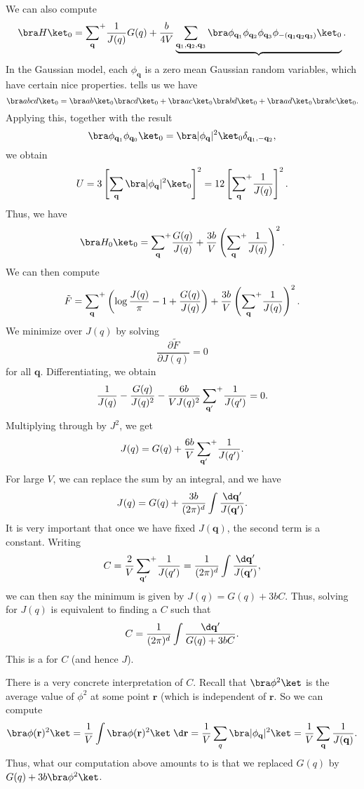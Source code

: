 \documentclass[a4paper]{article}
\newcommand\splus{\!{\vphantom{\prod}}^+}
\begin{document}
We can also compute
\[
  \bra H\ket_0 = \sum_\mathbf{q} \splus \frac{1}{J(q)} G(q) + \frac{b}{4V} \underbrace{\sum_{\mathbf{q}_1, \mathbf{q}_2, \mathbf{q}_3}\bra \phi_{\mathbf{q}_1} \phi_{\mathbf{q}_2} \phi_{\mathbf{q}_3} \phi_{-(\mathbf{q}_1 \mathbf{q}_2 \mathbf{q}_3)}\ket_0}.
\]
In the Gaussian model, each $\phi_\mathbf{q}$ is a zero mean Gaussian random variables, which have certain nice properties.  tells us we have
\[
  \bra abcd \ket_0 = \bra ab\ket_0 \bra cd\ket_0 + \bra ac\ket_0 \bra bd\ket_0 + \bra ad\ket_0 \bra bc\ket_0.
\]
Applying this, together with the result
\[
  \bra \phi_{\mathbf{q}_1} \phi_{\mathbf{q}_0}\ket_0 = \bra |\phi_\mathbf{q}|^2 \ket_0 \delta_{\mathbf{q}_1, - \mathbf{q}_2},
\]
we obtain
\[
  U = 3 \left[\sum_\mathbf{q} \bra |\phi_\mathbf{q}|^2\ket_0\right]^2 = 12 \left[\sum_\mathbf{q} \splus \frac{1}{J(q)}\right]^2.
\]
Thus, we have
\[
  \bra H_0\ket_0 = \sum_{\mathbf{q}} \splus \frac{G(q)}{J(q)} + \frac{3b}{V} \left(\sum_\mathbf{q} \splus \frac{1}{J(q)}\right)^2.
\]
We can then compute
\[
  \tilde{F} = \sum_{\mathbf{q}} \splus \left(\log \frac{J(q)}{\pi} - 1 + \frac{G(q)}{J(q)}\right) + \frac{3b}{V}\left(\sum_\mathbf{q} \splus \frac{1}{J(q)}\right)^2.
\]
We minimize over $J(q)$ by solving
\[
  \frac{\partial \tilde{F}}{\partial J(q)} = 0
\]
for all $\mathbf{q}$. Differentiating, we obtain
\[
  \frac{1}{J(q)} - \frac{G(q)}{J(q)^2} - \frac{6b}{V J(q)^2} \sum_{\mathbf{q}'} \splus \frac{1}{J(q')} = 0.
\]
Multiplying through by $J^2$, we get
\[
  J(q) = G(q) + \frac{6b}{V} \sum_{\mathbf{q}'} \splus \frac{1}{J(q')}.
\]
For large $V$, we can replace the sum by an integral, and we have
\[
  J(q) = G(q) + \frac{3b}{(2\pi)^d} \int \frac{\d \mathbf{q}'}{J(\mathbf{q}')}.
\]
It is very important that once we have fixed $J(\mathbf{q})$, the second term is a constant. Writing
\[
  C = \frac{2}{V} \sum_{\mathbf{q}'} \splus \frac{1}{J(q')} = \frac{1}{(2\pi)^d} \int \frac{\d \mathbf{q}'}{J(\mathbf{q}')},
\]
we can then say the minimum is given by $J(q) = G(q) + 3bC$. Thus, solving for $J(q)$ is equivalent to finding a $C$ such that
\[
  C = \frac{1}{(2\pi)^d} \int \frac{\d \mathbf{q}'}{G(q) + 3bC}.
\]
This is a  for $C$ (and hence $J$).

There is a very concrete interpretation of $C$. Recall that $\bra \phi^2\ket$ is the average value of $\phi^2$ at some point $\mathbf{r}$ (which is independent of $\mathbf{r}$. So we can compute
\[
  \bra \phi(\mathbf{r})^2\ket = \frac{1}{V} \int \bra \phi(\mathbf{r})^2\ket \;\d \mathbf{r} = \frac{1}{V} \sum_q \bra |\phi_\mathbf{q}|^2 \ket = \frac{1}{V} \sum_{\mathbf{q}} \frac{1}{J(\mathbf{q})}.
\]
Thus, what our computation above amounts to is that we replaced $G(q)$ by $G(q) + 3b \bra \phi^2\ket$.
\end{document}
